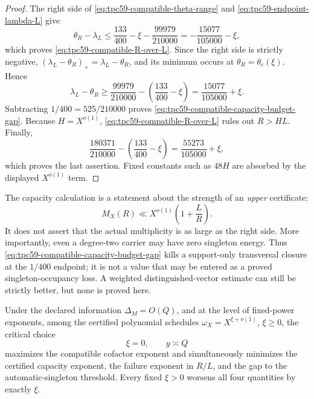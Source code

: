 \begin{proof}
The right side of \eqref{eq:tpc59-compatible-theta-range} and
\eqref{eq:tpc59-endpoint-lambda-L} give
\[
 \theta_R-\lambda_L
 \le\frac{133}{400}-\xi-\frac{99979}{210000}
 =-\frac{15077}{105000}-\xi,
\]
which proves \eqref{eq:tpc59-compatible-R-over-L}.  Since the right side is
strictly negative, \((\lambda_L-\theta_R)_+=\lambda_L-\theta_R\), and its
minimum occurs at \(\theta_R=\theta_c(\xi)\).  Hence
\[
 \lambda_L-\theta_R
 \ge\frac{99979}{210000}
       -\left(\frac{133}{400}-\xi\right)
 =\frac{15077}{105000}+\xi.
\]
Subtracting \(1/400=525/210000\) proves
\eqref{eq:tpc59-compatible-capacity-budget-gap}.  Because \(H=X^{o(1)}\),
\eqref{eq:tpc59-compatible-R-over-L} rules out \(R>HL\).
Finally,
\[
 \frac{180371}{210000}
 -\left(\frac{133}{400}-\xi\right)
 =\frac{55273}{105000}+\xi,
\]
which proves the last assertion.  Fixed constants such as \(48H\) are
absorbed by the displayed \(X^{o(1)}\) term.
\end{proof}

The capacity calculation is a statement about the strength of an
\emph{upper} certificate:
\begin{equation}
 M_X(R)\ll X^{o(1)}\left(1+\frac LR\right).
 \label{eq:tpc59-capacity-certificate-reminder}
\end{equation}
It does not assert that the actual multiplicity is as large as the right
side.  More importantly, even a degree-two carrier may have zero singleton
energy.  Thus \eqref{eq:tpc59-compatible-capacity-budget-gap} kills a
support-only transversal closure at the \(1/400\) endpoint; it is not a
value that may be entered as a proved singleton-occupancy loss.  A weighted
distinguished-vector estimate can still be strictly better, but none is
proved here.

\begin{corollary}
\label{cor:tpc59-critical-cutoff-optimal}
Under the declared information \(\Delta_M=O(Q)\), and at the level of
fixed-power exponents, among the certified polynomial schedules
\(\omega_X=X^{\xi+o(1)}\), \(\xi\ge0\), the critical choice
\begin{equation}
 \boxed{\xi=0,\qquad y\asymp Q}
 \label{eq:tpc59-xi-zero-optimal}
\end{equation}
maximizes the compatible cofactor exponent and simultaneously minimizes
the certified capacity exponent, the failure exponent in \(R/L\), and the
gap to the automatic-singleton threshold.  Every fixed \(\xi>0\) worsens
all four quantities by exactly \(\xi\).
\end{corollary}

